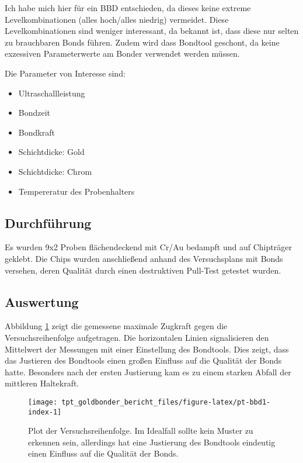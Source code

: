 \documentclass[
  paper=a4,
  ,captions=tableheading
]{scrartcl}
\providecommand{\tightlist}{%
  \setlength{\itemsep}{0pt}\setlength{\parskip}{0pt}}
\begin{document}
Ich habe mich hier für ein BBD entschieden, da dieses keine extreme Levelkombinationen (alles hoch/alles niedrig) vermeidet. Diese Levelkombinationen sind weniger interessant, da bekannt ist, dass diese nur selten zu brauchbaren Bonds führen. Zudem wird dass Bondtool geschont, da keine exzessiven Parameterwerte am Bonder verwendet werden müssen.

Die Parameter von Interesse sind:

\begin{itemize}
\tightlist
\item
  Ultraschallleistung
\item
  Bondzeit
\item
  Bondkraft
\item
  Schichtdicke: Gold
\item
  Schichtdicke: Chrom
\item
  Tempereratur des Probenhalters
\end{itemize}

\hypertarget{pt-bbd-methods}{%
\subsection{Durchführung}\label{pt-bbd-methods}}

Es wurden 9x2 Proben flächendeckend mit Cr/Au bedampft und auf Chipträger geklebt. Die Chips wurden anschließend anhand des Versuchsplans mit Bonds versehen, deren Qualität durch einen destruktiven Pull-Test getestet wurden.

\hypertarget{auswertung-2}{%
\subsection{Auswertung}\label{auswertung-2}}

Abbildung \ref{fig:pt-bbd1-index} zeigt die gemessene maximale Zugkraft gegen die Versuchsreihenfolge aufgetragen. Die horizontalen Linien signalisieren den Mittelwert der Messungen mit einer Einstellung des Bondtools. Dies zeigt, dass das Justieren des Bondtools einen großen Einfluss auf die Qualität der Bonds hatte. Besonders nach der ersten Justierung kam es zu einem starken Abfall der mittleren Haltekraft.

\begin{figure}

{\centering \texttt{[image: tpt\_goldbonder\_bericht\_files/figure-latex/pt-bbd1-index-1]} 

}

\caption{Plot der Versuchsreihenfolge. Im Idealfall sollte kein Muster zu erkennen sein, allerdings hat eine Justierung des Bondtools eindeutig einen Einfluss auf die Qualität der Bonds.}\label{fig:pt-bbd1-index}
\end{figure}
\end{document}
